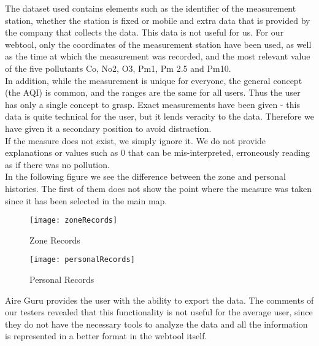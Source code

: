 The dataset used contains elements such as the identifier of the measurement station, whether the station is fixed or mobile
and extra data that is provided by the company that collects the data. This data is not useful for us.
For our webtool, only the coordinates of the measurement station have been used, as well as the time at which the measurement was recorded,
and the most relevant value of the five pollutants Co, No2, O3, Pm1, Pm 2.5 and Pm10.\\

In addition, while the measurement is unique for everyone, the general concept (the AQI) is common, and the ranges are the same for all users.
Thus the user has only a single concept to grasp. Exact measurements have been given - this data is quite technical for the user, but 
it lends veracity to the data. Therefore we have given it a secondary position to avoid distraction.\\

If the measure does not exist, we simply ignore it. We do not provide explanations or values such as 0 that can be mis-interpreted, erroneously reading as if there was no pollution.\\

In the following figure we see the difference between the zone and personal histories. The first of them does not show
the point where the measure was taken since it has been selected in the main map.\\


\begin{figure}[ht]
    \centering
    \texttt{[image: zoneRecords]}
    \caption{Zone Records}
\end{figure}

\begin{figure}[ht]
    \centering
    \texttt{[image: personalRecords]}
    \caption{Personal Records}
\end{figure}

Aire Guru provides the user with the ability to export the data. The comments of our testers revealed
that this functionality is not useful for the average user, since they do not have the necessary tools to
analyze the data and all the information is represented in a better format in the webtool itself.